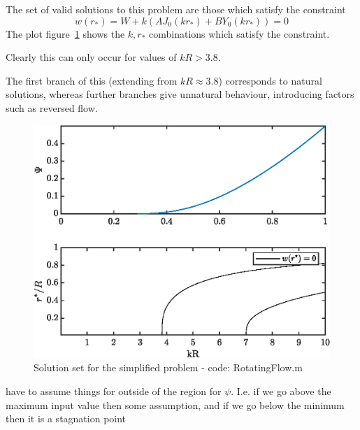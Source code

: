 \documentclass{X:/Documents/Coding/Latex/myreport}
\begin{document}
The set of valid solutions to this problem are those which satisfy the constraint
\[w(r_*) = W + k(AJ_0(kr_*) + BY_0(kr_*)) = 0\]
The plot figure~\ref{fig:contourSolutions} shows the $k,r_*$ combinations which satisfy the constraint. 

Clearly this can only occur for values of $kR > 3.8$. 

The first branch of this (extending from $kR\approx 3.8$) corresponds to natural solutions, whereas further branches give unnatural behaviour, introducing factors such as reversed flow.



\begin{figure}[h]
    \centering
    \label{fig:contourSolutions}
    \includegraphics[width=\linewidth]{Plots/kRstarContour}
    \caption{Solution set for the simplified problem - code: RotatingFlow.m}
\end{figure}
\newpage


\clearpage


have to assume things for outside of the region for $\psi$.  I.e. if we go above the maximum input value then some assumption, and if we go below the minimum then it is a stagnation point

\end{document}
